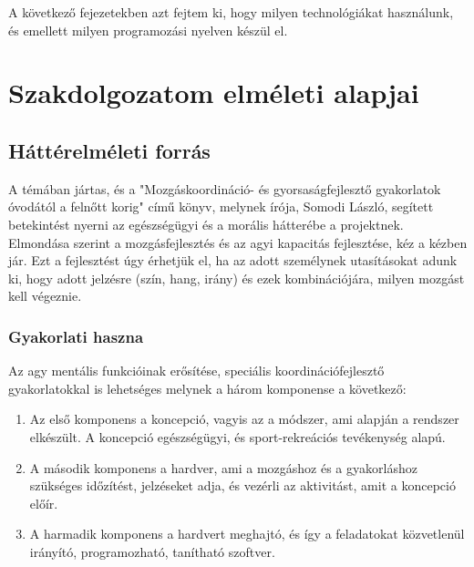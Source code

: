 \documentclass[tocnopagenum]{thesis-ekf}
\theoremstyle{definition}
\theoremstyle{remark}
\begin{document}
	A következő fejezetekben azt fejtem ki, hogy milyen technológiákat használunk, és emellett milyen programozási nyelven készül el. \\ 

	

	\chapter{Szakdolgozatom elméleti alapjai}
	\section{Háttérelméleti forrás}
	\par
	A témában jártas, és a "Mozgáskoordináció- és gyorsaságfejlesztő gyakorlatok óvodától a felnőtt korig" \cite{SLaszlo} című könyv, melynek írója, Somodi László, segített betekintést nyerni az egészségügyi és a morális hátterébe a projektnek. \\ Elmondása szerint a mozgásfejlesztés és az agyi kapacitás fejlesztése, kéz a kézben jár. Ezt a fejlesztést úgy érhetjük el, ha az adott személynek utasításokat adunk ki, hogy adott jelzésre (szín, hang, irány) és ezek kombinációjára, milyen mozgást kell végeznie.
	\par 
	\subsection{Gyakorlati haszna}
	Az agy mentális funkcióinak erősítése, speciális koordinációfejlesztő gyakorlatokkal is lehetséges melynek a három komponense a következő: 
	\begin{enumerate}
	 
			\item	Az első komponens a koncepció, vagyis az a módszer, ami alapján a rendszer elkészült. A koncepció egészségügyi, és sport-rekreációs tevékenység alapú.
			\item	A második komponens a hardver, ami a mozgáshoz és a gyakorláshoz szükséges időzítést, jelzéseket adja, és vezérli az aktivitást, amit a koncepció előír.
			\item	A harmadik komponens a hardvert meghajtó, és így a feladatokat közvetlenül irányító, programozható, tanítható szoftver.
	\end{enumerate}
\end{document}
